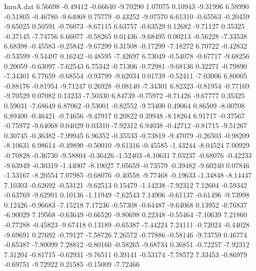 \begin{filecontents}{ImuA.dat}
   6.56698   -0.49412   -0.66640   -9.70290    1.07075    0.10943   -9.31996
   6.58990   -0.51805   -0.46780   -9.64068    0.75779   -0.43252   -9.07570
   6.61310   -0.65563   -0.20459   -9.65025    0.50591   -0.76073   -8.67115
   6.63757   -0.63529    0.12682   -9.71127    0.35325   -0.37145   -7.74756
   6.66077   -0.58265    0.01436   -9.68495    0.00213   -0.56228   -7.33538
   6.68398   -0.45583   -0.25842   -9.67299    0.31508   -0.17299   -7.18272
   6.70722   -0.42832   -0.53599   -9.54497    0.16242   -0.48595   -7.42697
   6.73049   -0.54078   -0.67717   -9.68256    0.20059   -0.63097   -7.62543
   6.75342   -0.71306   -0.72981   -9.68136    0.32271   -0.79890   -7.34301
   6.77659   -0.68554   -0.93799   -9.62034    0.01739   -0.52411   -7.03006
   6.80005   -0.88176   -0.81954   -9.71247    0.26928   -0.08140   -7.34301
   6.82323   -0.81954   -0.77169   -9.70529    0.07082    0.13233   -7.50330
   6.84739   -0.75972   -0.71426   -9.67777    0.35325    0.59031   -7.68649
   6.87062   -0.53001   -0.82552   -9.73400    0.49064    0.86509   -8.00708
   6.89400   -0.46421   -0.74656   -9.47917    0.20822    0.39948   -8.18264
   6.91717   -0.37567   -0.75972   -9.64068    0.04029    0.03310   -7.92312
   6.94038   -0.42712   -0.81715   -9.51267    0.30745   -0.36382   -7.99945
   6.96352   -0.35533   -0.73819   -9.47079   -0.26503   -0.98209   -8.10631
   6.98614   -0.49890   -0.50010   -9.61316   -0.45585   -1.43244   -8.04524
   7.00929   -0.70828   -0.36730   -9.58804   -0.36426   -1.52403   -8.10631
   7.03237   -0.68076   -0.42233   -9.63949   -0.30319   -1.44007   -8.19027
   7.05659   -0.73579   -0.39482   -9.60240    0.07846   -1.53167   -8.20554
   7.07985   -0.68076   -0.40558   -9.77468   -0.19633   -1.34848   -8.14447
   7.10303   -0.62692   -0.53121   -9.62513    0.15479   -1.14238   -7.92312
   7.12604   -0.59342   -0.63769   -9.62991    0.10136   -1.11949   -7.62543
   7.14906   -0.61137   -0.61496   -9.73998    0.12426   -0.96683   -7.15218
   7.17236   -0.57308   -0.64487   -9.64068    0.13952   -0.76837   -6.90029
   7.19568   -0.63649   -0.66520   -9.80698    0.22348   -0.55464   -7.10639
   7.21860   -0.77288   -0.45823   -9.67418    0.13189   -0.65387   -7.44224
   7.24111   -0.72024   -0.44028   -9.69691    0.27692   -0.79127   -7.58726
   7.26572   -0.77886   -0.58146   -9.73759    0.46774   -0.65387   -7.80099
   7.28812   -0.80160   -0.58265   -9.68734    0.36851   -0.72257   -7.92312
   7.31204   -0.81715   -0.62931   -9.76511    0.39141   -0.53174   -7.78572
   7.33453   -0.86979   -0.69751   -9.72922    0.21585   -0.15009   -7.72466

\end{filecontents}
